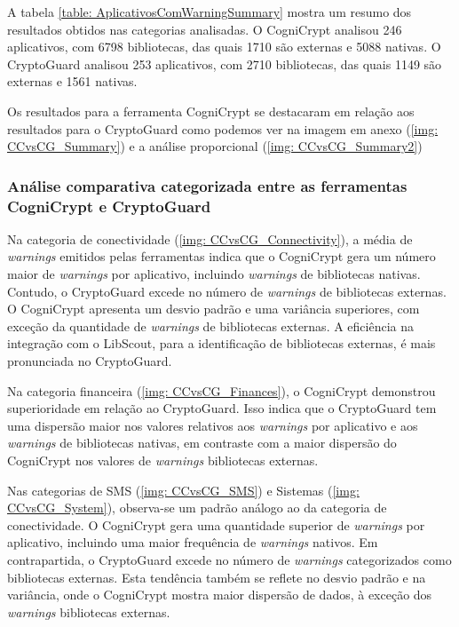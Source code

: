 A tabela \ref{table: AplicativosComWarningSummary} mostra um resumo dos resultados obtidos nas categorias analisadas. O CogniCrypt analisou 246 aplicativos, com 6798 bibliotecas, das quais 1710 são externas e 5088 nativas. O CryptoGuard analisou 253 aplicativos, com 2710 bibliotecas, das quais 1149 são externas e 1561 nativas.

Os resultados para a ferramenta CogniCrypt se destacaram em relação aos resultados para o CryptoGuard como podemos ver na imagem em anexo (\ref{img: CCvsCG_Summary}) e a análise proporcional (\ref{img: CCvsCG_Summary2})

\subsubsection{Análise comparativa categorizada entre as ferramentas CogniCrypt e CryptoGuard}

Na categoria de conectividade (\ref{img: CCvsCG_Connectivity}), a média de \textit{warnings} emitidos pelas ferramentas indica que o CogniCrypt gera um número maior de \textit{warnings} por aplicativo, incluindo \textit{warnings} de bibliotecas nativas. Contudo, o CryptoGuard excede no número de \textit{warnings} de bibliotecas externas.
O CogniCrypt apresenta um desvio padrão e uma variância superiores, com exceção da quantidade de \textit{warnings} de bibliotecas externas.
A eficiência na integração com o LibScout, para a identificação de bibliotecas externas, é mais pronunciada no CryptoGuard.


Na categoria financeira  (\ref{img: CCvsCG_Finances}), o CogniCrypt demonstrou superioridade em relação ao CryptoGuard.
Isso indica que o CryptoGuard tem uma dispersão maior nos valores relativos aos \textit{warnings} por aplicativo e aos \textit{warnings} de bibliotecas nativas, em contraste com a maior dispersão do CogniCrypt nos valores de \textit{warnings} bibliotecas externas.


Nas categorias de SMS (\ref{img: CCvsCG_SMS}) e Sistemas (\ref{img: CCvsCG_System}), observa-se um padrão análogo ao da categoria de conectividade.
O CogniCrypt gera uma quantidade superior de \textit{warnings} por aplicativo, incluindo uma maior frequência de \textit{warnings} nativos.
Em contrapartida, o CryptoGuard excede no número de \textit{warnings} categorizados como bibliotecas externas.
Esta tendência também se reflete no desvio padrão e na variância, onde o CogniCrypt mostra maior dispersão de dados, à exceção dos \textit{warnings} bibliotecas externas.

